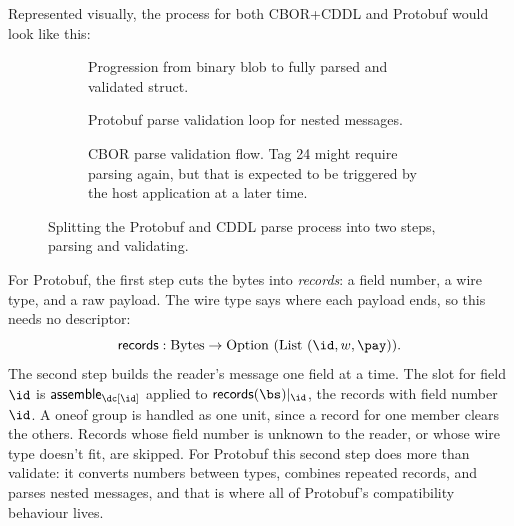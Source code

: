 Represented visually, the process for both CBOR+CDDL and Protobuf would look
like this:

\begin{figure}[H]
  \centering
  \begin{subfigure}[b]{\textwidth}
    \centering
    \caption{Progression from binary blob to fully parsed and validated struct.}
  \end{subfigure}

  \begin{subfigure}[b]{0.4\textwidth}
    \centering
    \caption{Protobuf parse validation loop for nested messages.}
  \end{subfigure}
  \hspace{1cm}
  \begin{subfigure}[b]{0.4\textwidth}
    \centering
    \caption{CBOR parse validation flow. Tag 24 might require parsing again, but
    that is expected to be triggered by the host application at a later time.}
  \end{subfigure}

  \caption{Splitting the Protobuf and CDDL parse process into two steps, parsing
    and validating.}
  \label{fig:parse-validate}
\end{figure}

For Protobuf, the first step cuts the bytes into \emph{records}: a field number,
a wire type, and a raw payload. The wire type says where each payload ends, so
this needs no descriptor:
\[ \records : \mathrm{Bytes} \to \mathrm{Option}\ (\mathrm{List}\ (\id, w, \pay)). \]
The second step builds the reader's message one field at a time. The slot for
field $\id$ is $\assemble_{\dc[\id]}$ applied to $\restr{\records(\bs)}{\id}$, the
records with field number $\id$. A oneof group is handled as one unit, since a
record for one member clears the others. Records whose field number is unknown
to the reader, or whose wire type doesn't fit, are skipped. For Protobuf this
second step does more than validate: it converts numbers between types,
combines repeated records, and parses nested messages, and that is where all of
Protobuf's compatibility behaviour lives.

